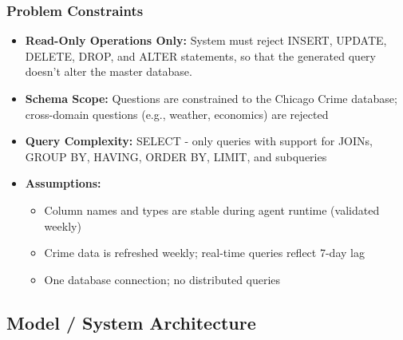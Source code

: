 \documentclass{article}
\begin{document}
\subsubsection{Problem Constraints}
\begin{itemize}
  \item \textbf{Read-Only Operations Only:} System must reject INSERT, UPDATE, DELETE, DROP, and ALTER statements, so that the generated query doesn't alter the master database.
  \item \textbf{Schema Scope:} Questions are constrained to the Chicago Crime database; cross-domain questions (e.g., weather, economics) are rejected
  \item \textbf{Query Complexity:} SELECT - only queries with support for JOINs, GROUP BY, HAVING, ORDER BY, LIMIT, and subqueries
  \item \textbf{Assumptions:}
  \begin{itemize}
    \item Column names and types are stable during agent runtime (validated weekly)
    \item Crime data is refreshed weekly; real-time queries reflect 7-day lag
    \item One database connection; no distributed queries
  \end{itemize}
\end{itemize}

\subsection{Model / System Architecture}
\end{document}

